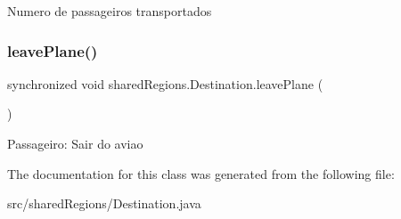 Numero de passageiros transportados \mbox{\label{classshared_regions_1_1_destination_a92d8a597465d7cb29ac87a41407794e7}} 
\subsubsection{\texorpdfstring{leave\+Plane()}{leavePlane()}}
{\footnotesize\ttfamily synchronized void shared\+Regions.\+Destination.\+leave\+Plane (\begin{DoxyParamCaption}{ }\end{DoxyParamCaption})\hspace{0.3cm}{\ttfamily [inline]}}

Passageiro\+: Sair do aviao 

The documentation for this class was generated from the following file\+:\begin{DoxyCompactItemize}
\item 
src/shared\+Regions/Destination.\+java\end{DoxyCompactItemize}
